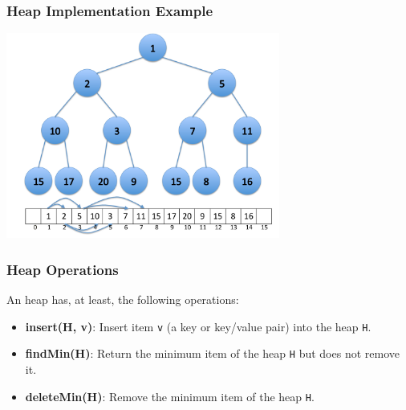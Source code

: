 \documentclass{beamer}
\begin{document}
\begin{frame}[containsverbatim]
\frametitle{Heap Implementation Example}

\begin{center}
\includegraphics[width=9cm]{heap_implementation.pdf}%
\end{center}

\end{frame}

\begin{frame}%
\frametitle{Heap Operations}

An heap has, at least, the following operations:
\vspace{0.3cm}
\begin{itemize}

\item<1-> \textbf{insert(H, v)}: Insert item \texttt{v} (a key or key/value pair) into the heap \texttt{H}.

\vspace{0.3cm}

\item<2-> \textbf{findMin(H)}: Return the minimum item of the heap \texttt{H} but does not remove it.

\vspace{0.3cm}

\item<3-> \textbf{deleteMin(H)}: Remove the minimum item of the heap \texttt{H}.
\end{itemize}

\end{frame}
\end{document}
